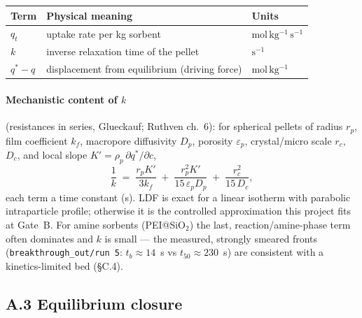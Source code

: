 \documentclass[11pt]{article}
\theoremstyle{remark}
\begin{document}
\begin{center}
\begin{tabular}{@{}l l l@{}}
\toprule
Term & Physical meaning & Units \\
\midrule
$q_t$ & uptake rate per kg sorbent & $\mathrm{mol\,kg^{-1}\,s^{-1}}$ \\
$k$ & inverse relaxation time of the pellet & $\mathrm{s^{-1}}$ \\
$q^*-q$ & displacement from equilibrium (driving force) & $\mathrm{mol\,kg^{-1}}$ \\
\bottomrule
\end{tabular}
\end{center}

\paragraph{Mechanistic content of $k$} (resistances in series, Glueckauf; Ruthven
ch.~6): for spherical pellets of radius $r_p$, film coefficient $k_f$, macropore
diffusivity $D_p$, porosity $\varepsilon_p$, crystal/micro scale $r_c$, $D_c$, and
local slope $K'=\rho_p\,\partial q^*/\partial c$,
\begin{equation*}
\frac{1}{k} \;=\; \frac{r_p K'}{3k_f} \;+\; \frac{r_p^2 K'}{15\,\varepsilon_p D_p}
\;+\; \frac{r_c^2}{15\,D_c},
\end{equation*}
each term a time constant (s). LDF is exact for a linear isotherm with parabolic
intraparticle profile; otherwise it is the controlled approximation this project
fits at Gate~B. For amine sorbents (PEI@SiO$_2$) the last, reaction/amine-phase
term often dominates and $k$ is small --- the measured, strongly smeared fronts
(\texttt{breakthrough\_out/run 5}: $t_b\approx14$~s vs $t_{50}\approx230$~s) are
consistent with a kinetics-limited bed (\S C.4).

\subsection*{A.3 Equilibrium closure}
\end{document}
